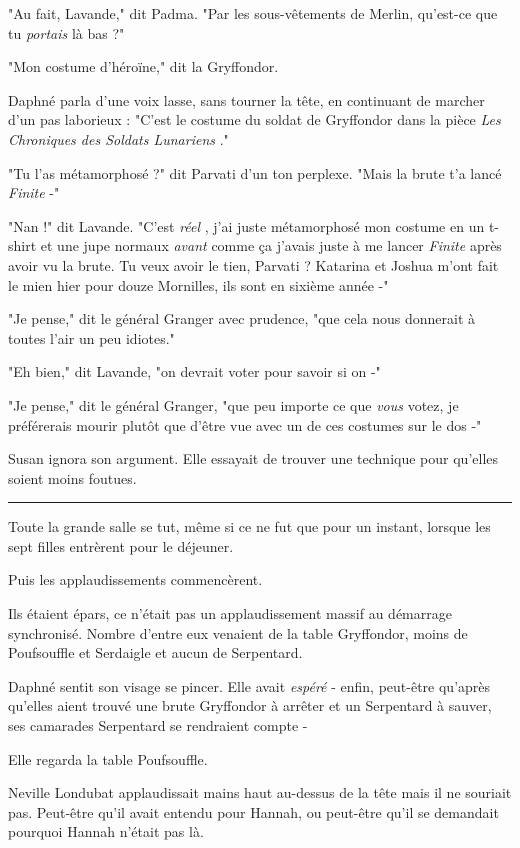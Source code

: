 "Au fait, Lavande," dit Padma. "Par les sous-vêtements de Merlin, qu'est-ce que tu \emph{portais}  là bas ?"

"Mon costume d'héroïne," dit la Gryffondor.

Daphné parla d'une voix lasse, sans tourner la tête, en continuant de marcher d'un pas laborieux : "C'est le costume du soldat de Gryffondor dans la pièce \emph{Les Chroniques des Soldats Lunariens} ."

"Tu l'as métamorphosé ?" dit Parvati d'un ton perplexe. "Mais la brute t'a lancé \emph{Finite}  -"

"Nan !" dit Lavande. "C'est \emph{réel} , j'ai juste métamorphosé mon costume en un t-shirt et une jupe normaux \emph{avant}  comme ça j'avais juste à me lancer \emph{Finite}  après avoir vu la brute. Tu veux avoir le tien, Parvati ? Katarina et Joshua m'ont fait le mien hier pour douze Mornilles, ils sont en sixième année -"

"Je pense," dit le général Granger avec prudence, "que cela nous donnerait à toutes l'air un peu idiotes."

"Eh bien," dit Lavande, "on devrait voter pour savoir si on -"

"Je pense," dit le général Granger, "que peu importe ce que \emph{vous } votez, je préférerais mourir plutôt que d'être vue avec un de ces costumes sur le dos -"

Susan ignora son argument. Elle essayait de trouver une technique pour qu'elles soient moins foutues.
\par\noindent\rule{\textwidth}{0.4pt}
Toute la grande salle se tut, même si ce ne fut que pour un instant, lorsque les sept filles entrèrent pour le déjeuner.

Puis les applaudissements commencèrent.

Ils étaient épars, ce n'était pas un applaudissement massif au démarrage synchronisé. Nombre d'entre eux venaient de la table Gryffondor, moins de Poufsouffle et Serdaigle et aucun de Serpentard.

Daphné sentit son visage se pincer. Elle avait \emph{espéré}  - enfin, peut-être qu'après qu'elles aient trouvé une brute Gryffondor à arrêter et un Serpentard à sauver, ses camarades Serpentard se rendraient compte -

Elle regarda la table Poufsouffle.

Neville Londubat applaudissait mains haut au-dessus de la tête mais il ne souriait pas. Peut-être qu'il avait entendu pour Hannah, ou peut-être qu'il se demandait pourquoi Hannah n'était pas là.

